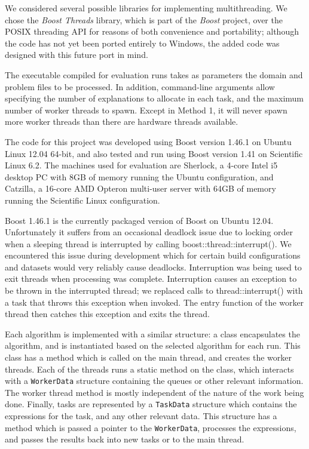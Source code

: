 \documentclass[12pt,twoside,abbrevs,msc,ai,notimes,logo,sansheadings]{infthesis}
\begin{document}
  We considered several possible libraries for implementing multithreading. We chose the \emph{Boost Threads} library, which is part of the \emph{Boost} project, over the POSIX threading API for reasons of both convenience and portability; although the code has not yet been ported entirely to Windows, the added code was designed with this future port in mind.
  
  The executable compiled for evaluation runs takes as parameters the domain and problem files to be processed. In addition, command-line arguments allow specifying the number of explanations to allocate in each task, and the maximum number of worker threads to spawn. Except in Method 1, it will never spawn more worker threads than there are hardware threads available.
  
  The code for this project was developed using Boost version 1.46.1 on Ubuntu Linux 12.04 64-bit, and also tested and run using Boost version 1.41 on Scientific Linux 6.2. The machines used for evaluation are Sherlock, a 4-core Intel i5 desktop PC with 8GB of memory running the Ubuntu configuration, and Catzilla, a 16-core AMD Opteron multi-user server with 64GB of memory running the Scientific Linux configuration.
  
  Boost 1.46.1 is the currently packaged version of Boost on Ubuntu 12.04. Unfortunately it suffers from an occasional deadlock issue due to locking order when a sleeping thread is interrupted by calling boost::thread::interrupt(). We encountered this issue during development which for certain build configurations and datasets would very reliably cause deadlocks. Interruption was being used to exit threads when processing was complete. Interruption causes an exception to be thrown in the interrupted thread; we replaced calls to thread::interrupt() with a task that throws this exception when invoked. The entry function of the worker thread then catches this exception and exits the thread.
  
  Each algorithm is implemented with a similar structure: a class encapsulates the algorithm, and is instantiated based on the selected algorithm for each run. This class has a method which is called on the main thread, and creates the worker threads. Each of the threads runs a static method on the class, which interacts with a \texttt{WorkerData} structure containing the queues or other relevant information. The worker thread method is mostly independent of the nature of the work being done. Finally, tasks are represented by a \texttt{TaskData} structure which contains the expressions for the task, and any other relevant data. This structure has a method which is passed a pointer to the \texttt{WorkerData}, processes the expressions, and passes the results back into new tasks or to the main thread.
  
\end{document}
